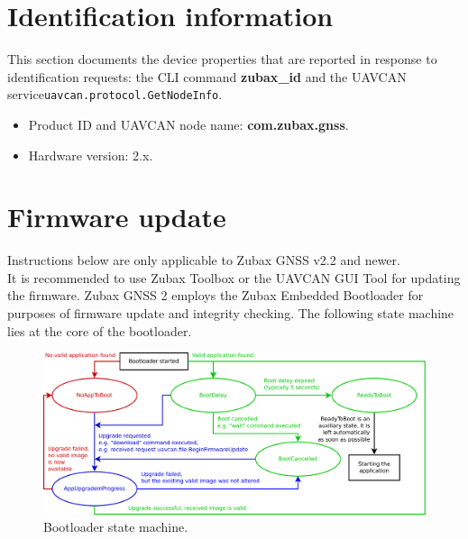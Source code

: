 \documentclass{zubaxdoc}
\begin{document}
\chapter{Identification information}

This section documents the device properties that are reported in response to identification requests: the CLI command \textbf{zubax{\_}id} and the UAVCAN service\texttt{uavcan.protocol.GetNodeInfo}.
\begin{itemize}
\item Product ID and UAVCAN node name: \textbf{com.zubax.gnss}.
\item Hardware version: 2.x.
\end{itemize}

\chapter{Firmware update}

Instructions below are only applicable to Zubax GNSS v2.2 and newer.\\
It is recommended to use Zubax Toolbox or the UAVCAN GUI Tool for updating the firmware. Zubax GNSS 2 employs the Zubax Embedded Bootloader for purposes of firmware update and integrity checking. The following state machine lies at the core of the bootloader.

\begin{figure}[!hbt]
	\centerline{\includegraphics[width=1.1\textwidth]{bootloader_state_machine}}
	\caption{Bootloader state machine.\label{drawing}}
\end{figure}
\end{document}

